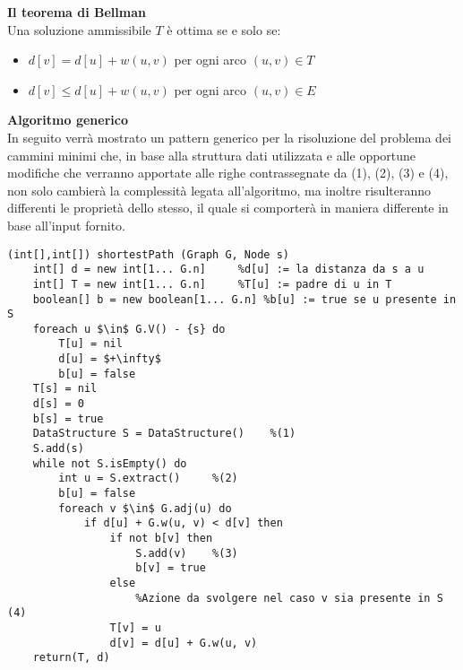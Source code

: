 \documentclass[../cheatSheetAlgoritmi.tex]{subfiles}
\begin{document}
\bigskip
\textbf{Il teorema di Bellman} \\
Una soluzione ammissibile $T$ è ottima se e solo se:
\begin{itemize}
	\item $d[v] = d[u] +w(u, v)$ per ogni arco $(u, v) \in T$
	\item $d[v] \leq d[u] +w(u, v)$ per ogni arco $(u, v) \in E$
\end{itemize}
\textbf{Algoritmo generico} \\
In seguito verrà mostrato un pattern generico per la risoluzione del problema dei cammini minimi che, in base alla struttura dati utilizzata e alle opportune modifiche che verranno apportate alle righe contrassegnate da (1), (2), (3) e (4), non solo cambierà la complessità legata all'algoritmo, ma inoltre risulteranno differenti le proprietà dello stesso, il quale si comporterà in maniera differente in base all'input fornito.
\begin{lstlisting}[caption=Algoritmo generico per il problema dei cammini minimi a sorgente singola]
(int[],int[]) shortestPath (Graph G, Node s)
	int[] d = new int[1... G.n]		%d[u] := la distanza da s a u 
	int[] T = new int[1... G.n]		%T[u] := padre di u in T
	boolean[] b = new boolean[1... G.n]	%b[u] := true se u presente in S 
	foreach u $\in$ G.V() - {s} do
		T[u] = nil
		d[u] = $+\infty$
		b[u] = false
	T[s] = nil
	d[s] = 0
	b[s] = true
	DataStructure S = DataStructure()	 %(1)
	S.add(s)
	while not S.isEmpty() do 
		int u = S.extract() 	%(2)
		b[u] = false
		foreach v $\in$ G.adj(u) do
			if d[u] + G.w(u, v) < d[v] then 
				if not b[v] then
					S.add(v)	%(3)
					b[v] = true
				else
					%Azione da svolgere nel caso v sia presente in S (4)
				T[v] = u 
				d[v] = d[u] + G.w(u, v)
	return(T, d)
\end{lstlisting}
 
\end{document}
